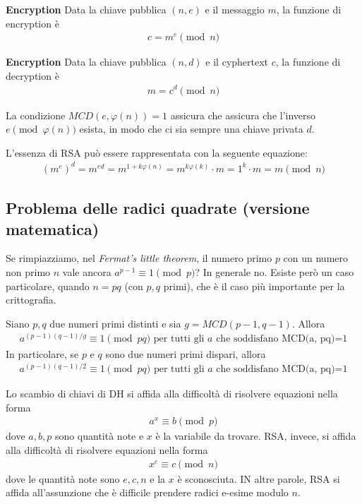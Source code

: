 \noindent \textbf{Encryption}
Data la chiave pubblica $(n, e)$ e il messaggio $m$, la funzione di encryption è
\begin{align*}
    c = m^e \pmod n
\end{align*}

\noindent \textbf{Encryption}
Data la chiave pubblica $(n, d)$ e il cyphertext $c$, la funzione di decryption è
\begin{align*}
    m = c^d \pmod n
\end{align*}

\noindent La condizione $MCD(e, \varphi(n)) = 1$ assicura che assicura che l'inverso $e \pmod{\varphi(n)}$ esista, in modo che ci sia sempre una chiave privata $d$.

\noindent L'essenza di RSA può essere rappresentata con la seguente equazione:
\begin{align*}
    (m^e)^d = m^{ed} = m^{1+ k\varphi(n)} = m^{k\varphi(k)} \cdot m = 1^k \cdot m = m \pmod n
 \end{align*}
 
\subsection{Problema delle radici quadrate (versione matematica)}
Se rimpiazziamo, nel \textit{Fermat’s little theorem}, il numero primo $p$ con un numero non primo $n$ vale ancora $a^{p-1}\equiv 1 \pmod p$? In generale no. Esiste però un caso particolare, quando $n = pq$ (con $p, q$ primi), che è il caso più importante per la crittografia. 
        
\begin{theorem}
    Siano \(p, q\) due numeri primi distinti e sia $g = MCD(p-1, q-1)$. Allora
    \begin{align*}
        a^{(p-1)(q-1)/g} \equiv 1 \pmod {pq} \text{ per tutti gli $a$ che soddisfano MCD(a, pq)=1}
    \end{align*}
    \noindent In particolare, se $p$ e $q$ sono due numeri primi dispari, allora 
    \begin{align*}
        a^{(p-1)(q-1)/2} \equiv 1 \pmod {pq} \text{ per tutti gli $a$ che soddisfano MCD(a, pq)=1}
    \end{align*}
\end{theorem}

\noindent Lo scambio di chiavi di DH si affida alla difficoltà di risolvere equazioni nella forma 
\begin{align*}
    a^x \equiv b \pmod p
\end{align*} 
\noindent dove $a, b, p$ sono quantità note e $x$ è la variabile da trovare. RSA, invece, si affida alla difficoltà di risolvere equazioni nella forma
\begin{align*}
    x^e \equiv c \pmod n
\end{align*}
\noindent dove le quantità note sono $e, c, n$ e la $x$ è sconosciuta. IN altre parole, RSA si affida all'assunzione che è difficile prendere radici e-esime modulo $n$. 

